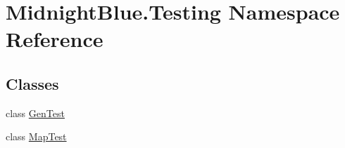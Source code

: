 \hypertarget{namespace_midnight_blue_1_1_testing}{}\section{Midnight\+Blue.\+Testing Namespace Reference}
\label{namespace_midnight_blue_1_1_testing}
\subsection*{Classes}
\begin{DoxyCompactItemize}
\item 
class \hyperlink{class_midnight_blue_1_1_testing_1_1_gen_test}{Gen\+Test}
\item 
class \hyperlink{class_midnight_blue_1_1_testing_1_1_map_test}{Map\+Test}
\end{DoxyCompactItemize}

